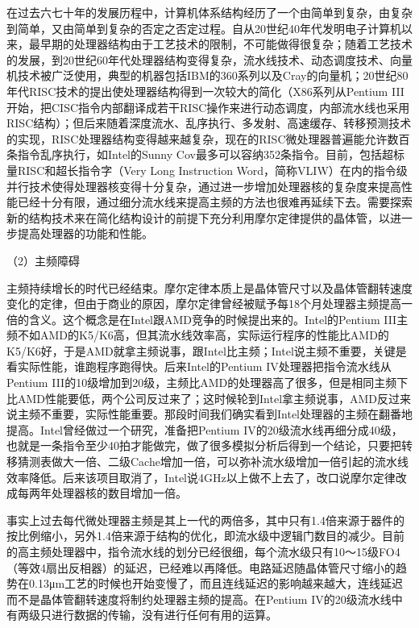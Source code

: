 \documentclass[]{ctexbook}
\begin{document}
在过去六七十年的发展历程中，计算机体系结构经历了一个由简单到复杂，由复杂到简单，又由简单到复杂的否定之否定过程。自从20世纪40年代发明电子计算机以来，最早期的处理器结构由于工艺技术的限制，不可能做得很复杂；随着工艺技术的发展，到20世纪60年代处理器结构变得复杂，流水线技术、动态调度技术、向量机技术被广泛使用，典型的机器包括IBM的360系列以及Cray的向量机；20世纪80年代RISC技术的提出使处理器结构得到一次较大的简化（X86系列从Pentium III开始，把CISC指令内部翻译成若干RISC操作来进行动态调度，内部流水线也采用RISC结构）；但后来随着深度流水、乱序执行、多发射、高速缓存、转移预测技术的实现，RISC处理器结构变得越来越复杂，现在的RISC微处理器普遍能允许数百条指令乱序执行，如Intel的Sunny Cov最多可以容纳352条指令。目前，包括超标量RISC和超长指令字（Very Long Instruction Word，简称VLIW）在内的指令级并行技术使得处理器核变得十分复杂，通过进一步增加处理器核的复杂度来提高性能已经十分有限，通过细分流水线来提高主频的方法也很难再延续下去。需要探索新的结构技术来在简化结构设计的前提下充分利用摩尔定律提供的晶体管，以进一步提高处理器的功能和性能。

（2）主频障碍

主频持续增长的时代已经结束。摩尔定律本质上是晶体管尺寸以及晶体管翻转速度变化的定律，但由于商业的原因，摩尔定律曾经被赋予每18个月处理器主频提高一倍的含义。这个概念是在Intel跟AMD竞争的时候提出来的。Intel的Pentium III主频不如AMD的K5/K6高，但其流水线效率高，实际运行程序的性能比AMD的K5/K6好，于是AMD就拿主频说事，跟Intel比主频；Intel说主频不重要，关键是看实际性能，谁跑程序跑得快。后来Intel的Pentium IV处理器把指令流水线从Pentium III的10级增加到20级，主频比AMD的处理器高了很多，但是相同主频下比AMD性能要低，两个公司反过来了；这时候轮到Intel拿主频说事，AMD反过来说主频不重要，实际性能重要。那段时间我们确实看到Intel处理器的主频在翻番地提高。Intel曾经做过一个研究，准备把Pentium IV的20级流水线再细分成40级，也就是一条指令至少40拍才能做完，做了很多模拟分析后得到一个结论，只要把转移猜测表做大一倍、二级Cache增加一倍，可以弥补流水级增加一倍引起的流水线效率降低。后来该项目取消了，Intel说4GHz以上做不上去了，改口说摩尔定律改成每两年处理器核的数目增加一倍。

事实上过去每代微处理器主频是其上一代的两倍多，其中只有1.4倍来源于器件的按比例缩小，另外1.4倍来源于结构的优化，即流水级中逻辑门数目的减少。目前的高主频处理器中，指令流水线的划分已经很细，每个流水级只有10～15级FO4（等效4扇出反相器）的延迟，已经难以再降低。电路延迟随晶体管尺寸缩小的趋势在0.13μm工艺的时候也开始变慢了，而且连线延迟的影响越来越大，连线延迟而不是晶体管翻转速度将制约处理器主频的提高。在Pentium IV的20级流水线中有两级只进行数据的传输，没有进行任何有用的运算。
\end{document}
